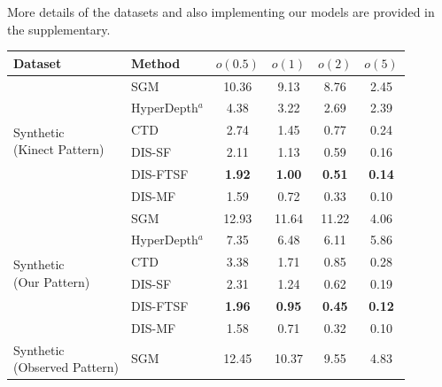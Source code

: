 More details of the datasets and also implementing our models are provided in the supplementary.

\begin{table}[t]
    \begin{center}
        \begin{threeparttable}
        \begin{tabular}{l|lcccc}
        \hline
        Dataset & Method & $o(0.5)$ & $o(1)$ & $o(2)$ & $o(5)$ \\
        \hline
        \multirow{6}{*}{ \parbox{20ex}{Synthetic \\ (Kinect Pattern)}} & SGM & 10.36 & \phantom{0}9.13 & \phantom{0}8.76 & \phantom{0}2.45 \\
        & HyperDepth$^a$ & \phantom{0}4.38 & \phantom{0}3.22 & \phantom{0}2.69 & \phantom{0}2.39 \\
        & CTD & \phantom{0}2.74 & \phantom{0}1.45 & \phantom{0}0.77 & \phantom{0}0.24 \\
        & DIS-SF & \phantom{0}2.11 & \phantom{0}1.13 & \phantom{0}0.59 & \phantom{0}0.16 \\
        & DIS-FTSF & \phantom{0}\textbf{1.92} & \phantom{0}\textbf{1.00} & \phantom{0}\textbf{0.51} & \phantom{0}\textbf{0.14} \\
        \arrayrulecolor{lightgray}\cline{2-6}\arrayrulecolor{black}
        & DIS-MF & \phantom{0}1.59 & \phantom{0}0.72 & \phantom{0}0.33 & \phantom{0}0.10 \\
        \hline
        \hline
        \multirow{6}{*}{ \parbox{20ex}{Synthetic \\ (Our Pattern)} } & SGM & 12.93 & 11.64 & 11.22 & \phantom{0}4.06 \\
        & HyperDepth$^a$ & \phantom{0}7.35 & \phantom{0}6.48 & \phantom{0}6.11 & \phantom{0}5.86 \\
        & CTD & \phantom{0}3.38 & \phantom{0}1.71 & \phantom{0}0.85 & \phantom{0}0.28 \\
        & DIS-SF & \phantom{0}2.31 & \phantom{0}1.24 & \phantom{0}0.62 & \phantom{0}0.19 \\
        & DIS-FTSF & \phantom{0}\textbf{1.96} & \phantom{0}\textbf{0.95} & \phantom{0}\textbf{0.45} & \phantom{0}\textbf{0.12} \\ \arrayrulecolor{lightgray}\cline{2-6}\arrayrulecolor{black}
        & DIS-MF & \phantom{0}1.58 & \phantom{0}0.71 & \phantom{0}0.32 & \phantom{0}0.10 \\
        \hline
        \hline
        \multirow{6}{*}{ \parbox{20ex}{Synthetic \\ (Observed Pattern)} } & SGM & 12.45 & 10.37 & \phantom{0}9.55 & \phantom{0}4.83 \\

\end{tabular}
\end{threeparttable}
\end{center}
\end{table}

